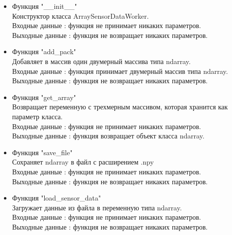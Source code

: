 \documentclass[a4document]{article}
\begin{document}
{\begin{itemize}
        \begin{itemize}
            \item Функция "\_\_init\_\_" \\
                Конструктор класса ArraySensorDataWorker.\\
                Входные данные : функция не принимает никаких параметров. \\ 
                Выходные данные : функция не возвращает никаких параметров.
            \item Функция "add\_pack" \\
                Добавляет в массив один двумерный массива типа ndarray. \\ 
                Входные данные : функция принимает двумерный массив типа ndarray. \\ 
                Выходные данные : функция не возвращает никаких параметров.
            \item Функция "get\_array" \\
                Возвращает переменную с трехмерным массивом, которая хранится как параметр класса.\\
                Входные данные : функция не принимает никаких параметров. \\ 
                Выходные данные : функция возвращает объект класса ndarray.
            \item Функция "save\_file" \\
                Сохраняет ndarray в файл с расширением .npy \\
                Входные данные : функция не принимает никаких параметров. \\ 
                Выходные данные : функция не возвращает никаких параметров.
            \item Функция "load\_sensor\_data" \\
                Загружает данные из файла в переменную типа ndarray.\\
                Входные данные : функция не принимает никаких параметров. \\ 
                Выходные данные : функция не возвращает никаких параметров.
        \end{itemize}
        

\end{itemize}}
\end{document}
